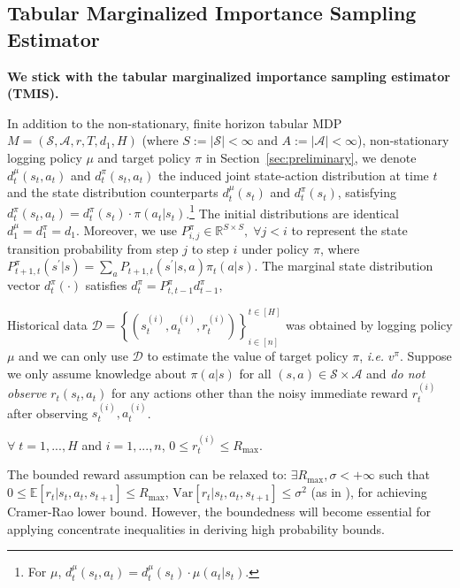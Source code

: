 

\subsection{Tabular Marginalized Importance Sampling Estimator}

\textbf{We stick with the tabular marginalized importance sampling estimator (TMIS). }

In addition to the non-stationary, finite horizon tabular MDP $M=(\mathcal{S},\mathcal{A},r,T,d_1,H)$ (where $S:=|\mathcal{S}|<\infty$ and $A:=|\mathcal{A}|<\infty$), non-stationary logging policy $\mu$ and target policy $\pi$ in Section~\ref{sec:preliminary}, we denote $d^\mu_t(s_t,a_t)$ and $d^\pi_t(s_t,a_t)$ the induced joint state-action distribution at time $t$ and the state distribution counterparts $d^\mu_t(s_t)$ and $d^\pi_t(s_t)$, satisfying $d^{\pi}_t(s_t,a_t)=d^{\pi}_t(s_t)\cdot \pi(a_t|s_t)$.\footnote{For $\mu$, $d^{\mu}_t(s_t,a_t)=d^{\mu}_t(s_t)\cdot \mu(a_t|s_t)$.} The initial distributions are identical $d_1^\mu=d^\pi_1=d_1$. Moreover, we use $P^\pi_{i,j}\in\mathbb{R}^{S\times S}, \;\forall j<i$ to represent the state transition probability from step $j$ to step $i$ under policy $\pi$, where $P^\pi_{t+1,t}(s^\prime|s)=\sum_a P_{t+1,t}(s^\prime|s,a)\pi_t(a|s)$.  The marginal state distribution vector ${d}_t^\pi(\cdot)$ satisfies
${d}_t^\pi  = {P}^{\pi}_{t,t-1} {d}_{t-1}^\pi,$

Historical data $\mathcal{D}=\left\lbrace (s_t^{(i)},a_t^{(i)},r_t^{(i)})\right\rbrace_{i\in[n]}^{t\in[H]} $ was obtained by logging policy $\mu$ and we can only use $\mathcal{D}$ to estimate the value of target policy $\pi$, \emph{i.e.} $v^\pi$. Suppose we only assume knowledge about $\pi(a|s)$ for all $(s,a)\in\mathcal{S}\times\mathcal{A}$ and \emph{do not observe} $r_t(s_t,a_t)$ for any actions other than the noisy immediate reward $r_t^{(i)}$ after observing $s_t^{(i)},a_t^{(i)}$. 

\begin{assumption}\label{assume1}
	 $\forall \;t=1,...,H$ and $i=1,...,n$, $0\leq r^{(i)}_t\leq R_{\max}$.
\end{assumption}
The bounded reward assumption can be relaxed to:  $\exists R_{\max},\sigma<+\infty$ such that $0\leq \mathbb{E}[r_t|s_t,a_t,s_{t+1}]\leq R_{\max}$, $\mathrm{Var}[r_t|s_t,a_t,s_{t+1}]\leq \sigma^2$ (as in \citet{xie2019towards}), for achieving Cramer-Rao lower bound. However, the boundedness will become essential for applying concentrate inequalities in deriving high probability bounds.

